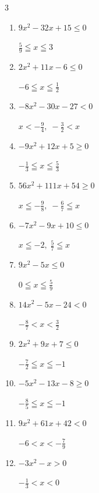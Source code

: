 \begin{multicols}{3}
\begin{enumerate}
        $\displaystyle x < -\frac{5}{7} , \; 5 < x$

\columnbreak %

  \item $9x^{2}-32x+15\leq 0$

        $\displaystyle \frac{5}{9} \leqq x \leqq 3$

  \item $2x^{2}+11x-6\leq 0$

        $\displaystyle -6 \leqq x \leqq \frac{1}{2}$

  \item $-8x^{2}-30x-27<0$

        $\displaystyle x < -\frac{9}{4} , \; -\frac{3}{2} < x$

  \item $-9x^{2}+12x+5\geq 0$

        $\displaystyle -\frac{1}{3} \leqq x \leqq \frac{5}{3}$

  \item $56x^{2}+111x+54\geq 0$

        $\displaystyle x \leqq -\frac{9}{8} , \; -\frac{6}{7} \leqq x$

  \item $-7x^{2}-9x+10\leq 0$

        $\displaystyle x \leqq -2 , \; \frac{5}{7} \leqq x$

  \item $9x^{2}-5x\leq 0$

        $\displaystyle 0 \leqq x \leqq \frac{5}{9}$

  \item $14x^{2}-5x-24<0$

        $\displaystyle -\frac{8}{7} < x < \frac{3}{2}$

  \item $2x^{2}+9x+7\leq 0$

        $\displaystyle -\frac{7}{2} \leqq x \leqq -1$

  \item $-5x^{2}-13x-8\geq 0$

        $\displaystyle -\frac{8}{5} \leqq x \leqq -1$

\columnbreak %

  \item $9x^{2}+61x+42<0$

        $\displaystyle -6 < x < -\frac{7}{9}$

  \item $-3x^{2}-x>0$

        $\displaystyle -\frac{1}{3} < x < 0$


\end{enumerate}
\end{multicols}
